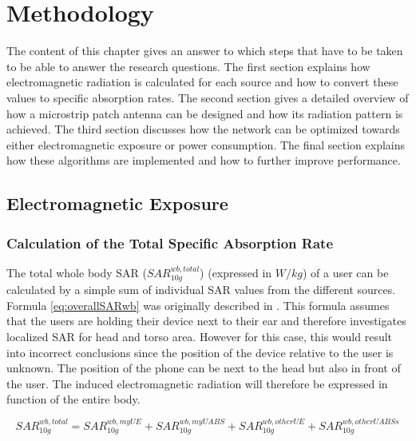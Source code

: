 \chapter{Methodology}
\label{chap:methodology}

The content of this chapter gives an answer to which steps that have to be taken to 
be able to answer the research questions.
The first section explains how electromagnetic radiation is calculated for each source
and how to convert these values to specific absorption rates. 
The second section gives a detailed overview of how a microstrip patch antenna can be 
designed and how its radiation pattern is achieved.
The third section discusses how the network can be optimized towards either electromagnetic 
exposure or power consumption.
The final section explains how these algorithms are implemented and how to further improve performance.

\section{Electromagnetic Exposure}
\subsection{Calculation of the Total Specific Absorption Rate} %
\label{sub:Calculationexposure}

The total whole body \gls{SAR} ($SAR^{wb,total}_{10g}$) (expressed in $W/kg$) of a user can be calculated by a simple sum of individual SAR values from the different sources.
Formula \ref{eq:overallSARwb} was originally described in \cite{J17_kuehn2019modelling}.
This formula assumes that the users are holding their device next to their ear and therefore 
investigates localized \gls{SAR} for head and torso area.
However for this case, this would result into incorrect conclusions since 
the position of the device relative to the user is unknown.
The position of the phone can be next to the head but also in front of the user.
The induced electromagnetic radiation will therefore be expressed in function of the entire body.


\begin{equation} 
SAR^{wb,total}_{10g} = SAR^{wb,myUE}_{10g} +  SAR^{wb,myUABS}_{10g} + SAR^{wb,otherUE}_{10g} + SAR^{wb,otherUABSs}_{10g}
\label{eq:overallSARwb}
\end{equation}

